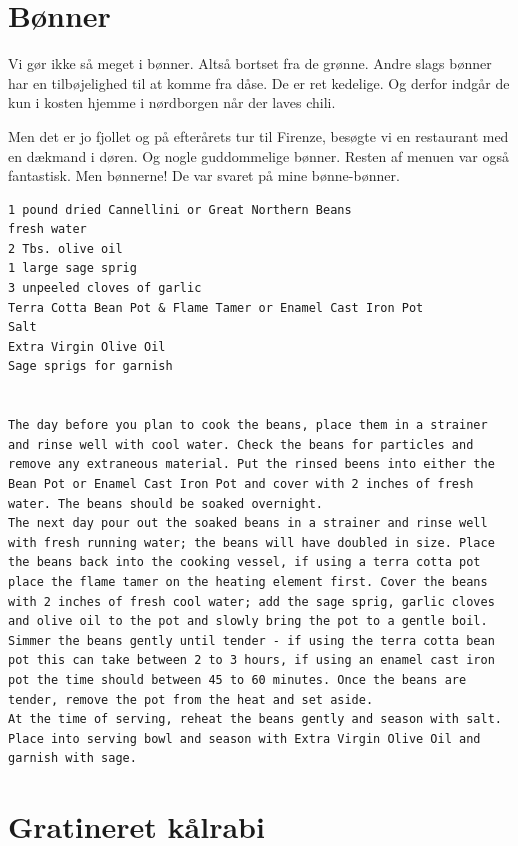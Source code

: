 \documentclass[
]{book}
\begin{document}
\hypertarget{buxf8nner}{%
\section{Bønner}\label{buxf8nner}}

Vi gør ikke så meget i bønner. Altså bortset fra de grønne. Andre slags bønner har en tilbøjelighed til at komme fra dåse. De er ret kedelige. Og derfor indgår de kun i kosten hjemme i nørdborgen når der laves chili.

Men det er jo fjollet og på efterårets tur til Firenze, besøgte vi en restaurant med en dækmand i døren. Og nogle guddommelige bønner. Resten af menuen var også fantastisk. Men bønnerne! De var svaret på mine bønne-bønner.

\begin{verbatim}
1 pound dried Cannellini or Great Northern Beans
fresh water
2 Tbs. olive oil
1 large sage sprig
3 unpeeled cloves of garlic
Terra Cotta Bean Pot & Flame Tamer or Enamel Cast Iron Pot
Salt
Extra Virgin Olive Oil
Sage sprigs for garnish


The day before you plan to cook the beans, place them in a strainer and rinse well with cool water. Check the beans for particles and remove any extraneous material. Put the rinsed beens into either the Bean Pot or Enamel Cast Iron Pot and cover with 2 inches of fresh water. The beans should be soaked overnight.
The next day pour out the soaked beans in a strainer and rinse well with fresh running water; the beans will have doubled in size. Place the beans back into the cooking vessel, if using a terra cotta pot place the flame tamer on the heating element first. Cover the beans with 2 inches of fresh cool water; add the sage sprig, garlic cloves and olive oil to the pot and slowly bring the pot to a gentle boil. Simmer the beans gently until tender - if using the terra cotta bean pot this can take between 2 to 3 hours, if using an enamel cast iron pot the time should between 45 to 60 minutes. Once the beans are tender, remove the pot from the heat and set aside.
At the time of serving, reheat the beans gently and season with salt. Place into serving bowl and season with Extra Virgin Olive Oil and garnish with sage.
\end{verbatim}

\hypertarget{gratineret-kuxe5lrabi}{%
\section{Gratineret kålrabi}\label{gratineret-kuxe5lrabi}}
\end{document}
